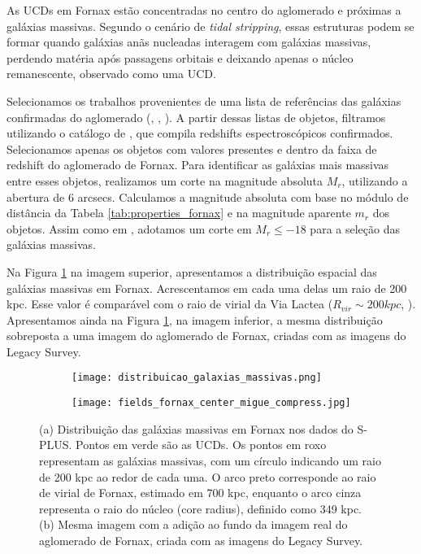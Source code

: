 As UCDs em Fornax estão concentradas no centro do aglomerado e próximas a galáxias massivas. Segundo o cenário de {\it tidal stripping}, essas estruturas podem se formar quando galáxias anãs nucleadas interagem com galáxias massivas, perdendo matéria após passagens orbitais e deixando apenas o núcleo remanescente, observado como uma UCD.

Selecionamos os trabalhos provenientes de uma lista de referências das galáxias confirmadas do aglomerado (\citealp{Ferguson_1989}, \citealp{Jordan_2007}, \citealp{Venhola_2018}). A partir dessas listas de objetos, filtramos utilizando o catálogo de \cite{Lima_2024}, que compila redshifts espectroscópicos confirmados. Selecionamos apenas os objetos com valores presentes e dentro da faixa de redshift do aglomerado de Fornax. Para identificar as galáxias mais massivas entre esses objetos, realizamos um corte na magnitude absoluta $M_r$, utilizando a abertura de 6 arcsecs. Calculamos a magnitude absoluta com base no módulo de distância da Tabela \ref{tab:properties_fornax} e na magnitude aparente $m_r$ dos objetos. Assim como em \cite{Saifollahi_2021}, adotamos um corte em $M_r \leq -18$ para a seleção das galáxias massivas.

Na Figura \ref{distribuicao_galaxias_massivas} na imagem superior, apresentamos a distribuição espacial das galáxias massivas em Fornax. Acrescentamos em cada uma delas um raio de 200 kpc. Esse valor é comparável com o raio de virial da Via Lactea ($R_{vir}\sim 200kpc$, \cite{Dehnen_2006}). Apresentamos ainda na Figura \ref{distribuicao_galaxias_massivas}, na imagem inferior, a mesma distribuição sobreposta a uma imagem do aglomerado de Fornax, criadas com as imagens do Legacy Survey.

\begin{figure}[!ht]
\centering
\captionsetup{justification=centering}
\begin{subfigure}[b]{0.75\textwidth}
    \texttt{[image: distribuicao\_galaxias\_massivas.png]}
    \caption{}
\end{subfigure}
\begin{subfigure}[b]{0.75\textwidth}
    \texttt{[image: fields\_fornax\_center\_migue\_compress.jpg]}
    \caption{}
\end{subfigure}
\caption{(a) Distribuição das galáxias massivas em Fornax nos dados do S-PLUS. Pontos em verde são as UCDs. Os pontos em roxo representam as galáxias massivas, com um círculo indicando um raio de 200 kpc ao redor de cada uma. O arco preto corresponde ao raio de virial de Fornax, estimado em 700 kpc, enquanto o arco cinza representa o raio do núcleo (core radius), definido como 349 kpc.\\ (b) Mesma imagem com a adição ao fundo da imagem real do aglomerado de Fornax, criada com as imagens do Legacy Survey.}
\label{distribuicao_galaxias_massivas}
\end{figure}

